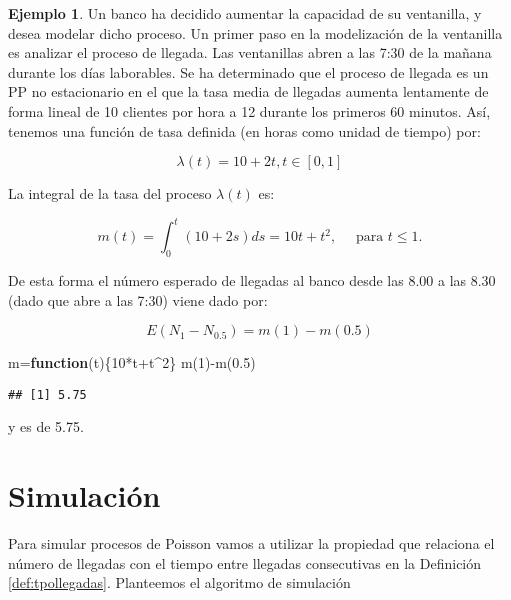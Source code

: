 \documentclass[
]{book}
\newenvironment{Shaded}{\begin{snugshade}}{\end{snugshade}}
\newcommand{\ControlFlowTok}[1]{\textcolor[rgb]{0.13,0.29,0.53}{\textbf{#1}}}
\newcommand{\DecValTok}[1]{\textcolor[rgb]{0.00,0.00,0.81}{#1}}
\newcommand{\FloatTok}[1]{\textcolor[rgb]{0.00,0.00,0.81}{#1}}
\newcommand{\FunctionTok}[1]{\textcolor[rgb]{0.00,0.00,0.00}{#1}}
\newcommand{\NormalTok}[1]{#1}
\newcommand{\OtherTok}[1]{\textcolor[rgb]{0.56,0.35,0.01}{#1}}
\newcommand{\SpecialCharTok}[1]{\textcolor[rgb]{0.00,0.00,0.00}{#1}}
\theoremstyle{definition}
\theoremstyle{definition}
\newtheorem{example}{Ejemplo}[chapter]
\theoremstyle{definition}
\theoremstyle{definition}
\theoremstyle{remark}
\begin{document}
\begin{example}
\protect\hypertarget{exm:pp005}{}\label{exm:pp005}Un banco ha decidido aumentar la capacidad de su ventanilla, y desea modelar dicho proceso. Un primer paso en la modelización de la ventanilla es analizar el proceso de llegada. Las ventanillas abren a las 7:30 de la mañana durante los días laborables. Se ha determinado que el proceso de llegada es un PP no estacionario en el que la tasa media de llegadas aumenta lentamente de forma lineal de 10 clientes por hora a 12 durante los primeros 60 minutos. Así, tenemos una función de tasa definida (en horas como unidad de tiempo) por:

\[\lambda(t) = 10 + 2t, t \in [0,1]\]

La integral de la tasa del proceso \(\lambda(t)\) es:

\[m(t) = \int_0^t (10+2s)ds = 10t + t^2, \quad \text{ para } t \leq 1.\]

De esta forma el número esperado de llegadas al banco desde las 8.00 a las 8.30 (dado que abre a las 7:30) viene dado por:

\[E(N_1 - N_{0.5}) = m(1) - m(0.5)\]

\begin{Shaded}
\begin{Highlighting}[]
\NormalTok{m}\OtherTok{=}\ControlFlowTok{function}\NormalTok{(t)\{}\DecValTok{10}\SpecialCharTok{*}\NormalTok{t}\SpecialCharTok{+}\NormalTok{t}\SpecialCharTok{\^{}}\DecValTok{2}\NormalTok{\}}
\FunctionTok{m}\NormalTok{(}\DecValTok{1}\NormalTok{)}\SpecialCharTok{{-}}\FunctionTok{m}\NormalTok{(}\FloatTok{0.5}\NormalTok{)}
\end{Highlighting}
\end{Shaded}

\begin{verbatim}
## [1] 5.75
\end{verbatim}

y es de 5.75.
\end{example}

\hypertarget{simulaciuxf3n}{%
\section{Simulación}\label{simulaciuxf3n}}

Para simular procesos de Poisson vamos a utilizar la propiedad que relaciona el número de llegadas con el tiempo entre llegadas consecutivas en la Definición \ref{def:tpollegadas}. Planteemos el algoritmo de simulación
\end{document}
